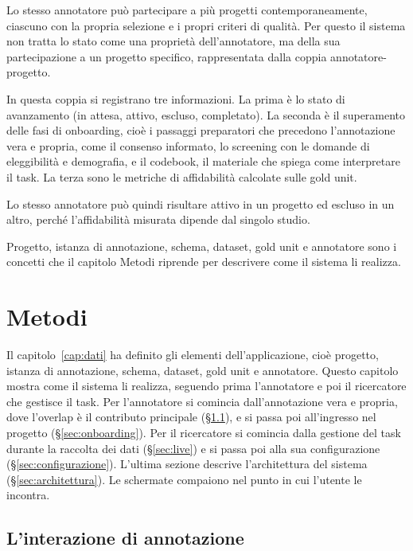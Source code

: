 \documentclass[]{sapthesis}
\begin{document}
Lo stesso annotatore può partecipare a più progetti contemporaneamente, ciascuno con la propria selezione e i propri criteri di qualità. Per questo il sistema non tratta lo stato come una proprietà dell'annotatore, ma della sua partecipazione a un progetto specifico, rappresentata dalla coppia annotatore-progetto.

In questa coppia si registrano tre informazioni. La prima è lo stato di avanzamento (in attesa, attivo, escluso, completato). La seconda è il superamento delle fasi di onboarding, cioè i passaggi preparatori che precedono l'annotazione vera e propria, come il consenso informato, lo screening con le domande di eleggibilità e demografia, e il codebook, il materiale che spiega come interpretare il task. La terza sono le metriche di affidabilità calcolate sulle gold unit.

Lo stesso annotatore può quindi risultare attivo in un progetto ed escluso in un altro, perché l'affidabilità misurata dipende dal singolo studio.

Progetto, istanza di annotazione, schema, dataset, gold unit e annotatore sono i concetti che il capitolo Metodi riprende per descrivere come il sistema li realizza.

\chapter{Metodi}
\label{cap:metodi}

Il capitolo~\ref{cap:dati} ha definito gli elementi dell'applicazione, cioè progetto, istanza di annotazione, schema, dataset, gold unit e annotatore. Questo capitolo mostra come il sistema li realizza, seguendo prima l'annotatore e poi il ricercatore che gestisce il task. Per l'annotatore si comincia dall'annotazione vera e propria, dove l'overlap è il contributo principale (\S\ref{sec:overlap}), e si passa poi all'ingresso nel progetto (\S\ref{sec:onboarding}). Per il ricercatore si comincia dalla gestione del task durante la raccolta dei dati (\S\ref{sec:live}) e si passa poi alla sua configurazione (\S\ref{sec:configurazione}). L'ultima sezione descrive l'architettura del sistema (\S\ref{sec:architettura}). Le schermate compaiono nel punto in cui l'utente le incontra.

\section{L'interazione di annotazione}
\label{sec:overlap}
\end{document}
